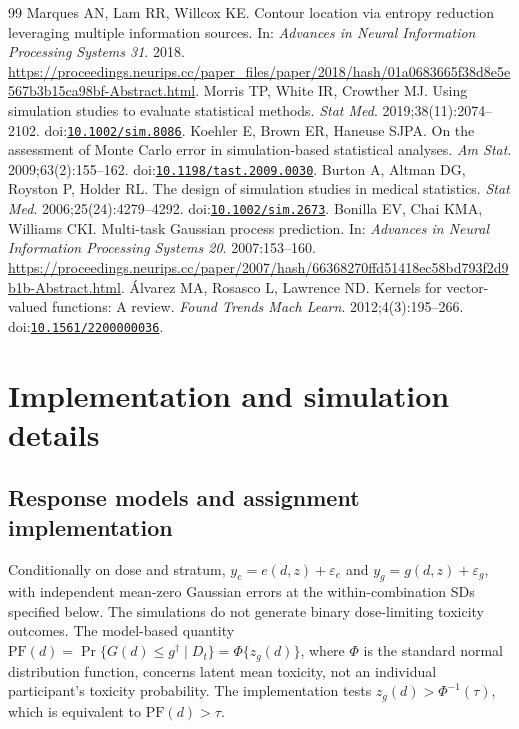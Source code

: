 \documentclass[11pt]{article}
\newcommand{\PF}{\mathrm{PF}}
\begin{document}
\begin{thebibliography}{99}
 Marques AN, Lam RR, Willcox KE. Contour location via entropy reduction leveraging multiple information sources. In: \textit{Advances in Neural Information Processing Systems 31}. 2018. \url{https://proceedings.neurips.cc/paper_files/paper/2018/hash/01a0683665f38d8e5e567b3b15ca98bf-Abstract.html}.
 Morris TP, White IR, Crowther MJ. Using simulation studies to evaluate statistical methods. \textit{Stat Med}. 2019;38(11):2074--2102. doi:\href{https://doi.org/10.1002/sim.8086}{\nolinkurl{10.1002/sim.8086}}.
 Koehler E, Brown ER, Haneuse SJPA. On the assessment of Monte Carlo error in simulation-based statistical analyses. \textit{Am Stat}. 2009;63(2):155--162. doi:\href{https://doi.org/10.1198/tast.2009.0030}{\nolinkurl{10.1198/tast.2009.0030}}.
 Burton A, Altman DG, Royston P, Holder RL. The design of simulation studies in medical statistics. \textit{Stat Med}. 2006;25(24):4279--4292. doi:\href{https://doi.org/10.1002/sim.2673}{\nolinkurl{10.1002/sim.2673}}.
 Bonilla EV, Chai KMA, Williams CKI. Multi-task Gaussian process prediction. In: \textit{Advances in Neural Information Processing Systems 20}. 2007:153--160. \url{https://proceedings.neurips.cc/paper/2007/hash/66368270ffd51418ec58bd793f2d9b1b-Abstract.html}.
 \'{A}lvarez MA, Rosasco L, Lawrence ND. Kernels for vector-valued functions: A review. \textit{Found Trends Mach Learn}. 2012;4(3):195--266. doi:\href{https://doi.org/10.1561/2200000036}{\nolinkurl{10.1561/2200000036}}.
\end{thebibliography}
\endgroup

\clearpage
\appendix

\section{Implementation and simulation details}\label{sec:phase}

\subsection{Response models and assignment implementation}\label{sec:acqdetails}

Conditionally on dose and stratum, $y_e=e(d,z)+\varepsilon_e$ and $y_g=g(d,z)+\varepsilon_g$, with independent mean-zero Gaussian errors at the within-combination SDs specified below. The simulations do not generate binary dose-limiting toxicity outcomes. The model-based quantity $\PF(d)=\Pr\{G(d)\le g^\dagger\mid D_t\}=\Phi\{z_g(d)\}$, where $\Phi$ is the standard normal distribution function, concerns latent mean toxicity, not an individual participant's toxicity probability. The implementation tests $z_g(d)>\Phi^{-1}(\tau)$, which is equivalent to $\PF(d)>\tau$.
\end{document}
